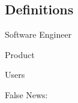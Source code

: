 
\subsection{Definitions}

\begin{enumerate}

Software Engineer

Product

Users

False News:

\end{enumerate}

